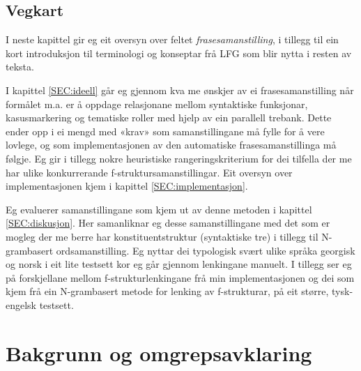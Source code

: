 \documentclass[12pt,a4paper,oneside,draft]{report}
\begin{document}
\section{Vegkart}
\label{sec-1.1}

I neste kapittel gir eg eit oversyn over feltet \emph{frasesamanstilling},
i tillegg til ein kort introduksjon til terminologi og konseptar frå
LFG som blir nytta i resten av teksta.

I kapittel \ref{SEC:ideell} går eg gjennom kva me ønskjer av ei
frasesamanstilling når formålet m.a. er å oppdage relasjonane mellom
syntaktiske funksjonar, kasusmarkering og tematiske roller med hjelp
av ein parallell trebank. Dette ender opp i ei mengd med «krav» som
samanstillingane må fylle for å vere lovlege, og som implementasjonen
av den automatiske frasesamanstillinga må følgje. Eg gir i tillegg
nokre heuristiske rangeringskriterium for dei tilfella der me har
ulike konkurrerande f\hyp{}struktursamanstillingar. Eit oversyn over
implementasjonen kjem i kapittel \ref{SEC:implementasjon}.

Eg evaluerer samanstillingane som kjem ut av denne metoden i kapittel
\ref{SEC:diskusjon}. Her samanliknar eg desse samanstillingane med det
som er mogleg der me berre har konstituentstruktur (syntaktiske tre) i
tillegg til N-grambasert ordsamanstilling. Eg nyttar dei typologisk
svært ulike språka georgisk og norsk i eit lite testsett kor eg går
gjennom lenkingane manuelt. I tillegg ser eg på forskjellane mellom
f\hyp{}strukturlenkingane frå min implementasjonen og dei som kjem frå ein
N-grambasert metode for lenking av f\hyp{}strukturar, på eit større,
tysk-engelsk testsett.





\chapter{Bakgrunn og omgrepsavklaring}
\label{sec-2}

\label{SEC:bakgrunn}

  
\end{document}
